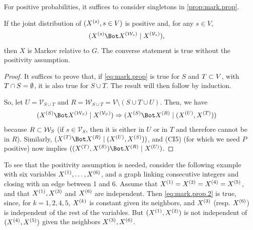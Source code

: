 For positive probabilities, it suffices to consider singletons in  \cref{prop:mark.prop}.
\begin{proposition}
\label{prop:mark.prop.2}
If the joint distribution of $(X^{(s)}, s\in V)$ is positive and, for any $s\in V$,
\begin{equation}
\label{eq:mark.prop.2}
\cind{\pe X s}{\pe X {\CW_s}}{\pe X {\mathcal V_s}},
\end{equation}
then
$X$ is Markov relative to $G$. The converse statement is true
without the positivity assumption.
\end{proposition}
\begin{proof}
It suffices to prove that,  if \cref{eq:mark.prop} is true for $S$ and $T\subset V$, with $T\cap S =
\emptyset$, it is also true for $S\cup
T$. The result will then follow by induction. 

So, let $U = \mathcal V_{S\cup T}$ and $R = \mathcal W_{S\cup T} = V \setminus (S\cup T\cup
U)$. Then, we have
$$\cind{\pe X S}{\pe X {\mathcal W_S}}{\pe X {\mathcal V_{S}}} \Ria
\cind{\pe X S}{\pe X R}{(\pe X U, \pe X T)}
$$
because $R\subset \mathcal {{\mathcal W}}_S$ (if $s\in \mathcal V_S$, then it is
either in $U$ or in $T$ and therefore cannot be in $R$). Similarly, 
$\cind{\pe X T}{\pe X R}{(\pe X U, \pe X S)}$, and (CI5) (for which we need $P$ positive) now
implies $\cind{(\pe X T, \pe X S)}{\pe X R}{\pe X U}$.
\end{proof}
To see that the positivity assumption is needed, consider the following
example with six variables $X^{(1)}, \ldots, X^{(6)}$, and a graph linking
consecutive integers and closing with an edge between 1 and
6. Assume that $X^{(1)} = X^{(2)}=X^{(4)}= X^{(5)}$, and that $X^{(1)}, X^{(3)}$ and $X^{(6)}$ are
independent. Then  \cref{eq:mark.prop.2}
is true, since, for $k=1,2,4,5$, $X^{(k)}$ is constant given its
neighbors, and $X^{(3)}$ (resp. $X^{(6)}$) is independent of the rest of the
variables. But $(X^{(1)}, X^{(2)})$ is not independent of $(X^{(4)},X^{(5)})$ given
the neighbors $X^{(3)}, X^{(6)}$.

